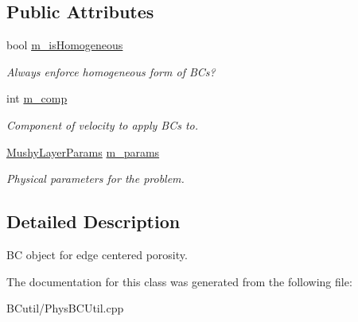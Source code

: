 \subsection*{Public Attributes}
\begin{DoxyCompactItemize}
\item 
\hypertarget{class_basic_porosity_face_b_c_function_a63e5bb418a8e68e6e7f1cc607ec0d169}{bool \hyperlink{class_basic_porosity_face_b_c_function_a63e5bb418a8e68e6e7f1cc607ec0d169}{m\-\_\-is\-Homogeneous}}\label{class_basic_porosity_face_b_c_function_a63e5bb418a8e68e6e7f1cc607ec0d169}

\begin{DoxyCompactList}\small\item\em Always enforce homogeneous form of B\-Cs? \end{DoxyCompactList}\item 
\hypertarget{class_basic_porosity_face_b_c_function_a09b90320f16a9a5c50f3470f3aa7e505}{int \hyperlink{class_basic_porosity_face_b_c_function_a09b90320f16a9a5c50f3470f3aa7e505}{m\-\_\-comp}}\label{class_basic_porosity_face_b_c_function_a09b90320f16a9a5c50f3470f3aa7e505}

\begin{DoxyCompactList}\small\item\em Component of velocity to apply B\-Cs to. \end{DoxyCompactList}\item 
\hypertarget{class_basic_porosity_face_b_c_function_a7cc80b99281b41fba79e7aefac18d924}{\hyperlink{class_mushy_layer_params}{Mushy\-Layer\-Params} \hyperlink{class_basic_porosity_face_b_c_function_a7cc80b99281b41fba79e7aefac18d924}{m\-\_\-params}}\label{class_basic_porosity_face_b_c_function_a7cc80b99281b41fba79e7aefac18d924}

\begin{DoxyCompactList}\small\item\em Physical parameters for the problem. \end{DoxyCompactList}\end{DoxyCompactItemize}


\subsection{Detailed Description}
B\-C object for edge centered porosity. 

The documentation for this class was generated from the following file\-:\begin{DoxyCompactItemize}
\item 
B\-Cutil/Phys\-B\-C\-Util.\-cpp\end{DoxyCompactItemize}
